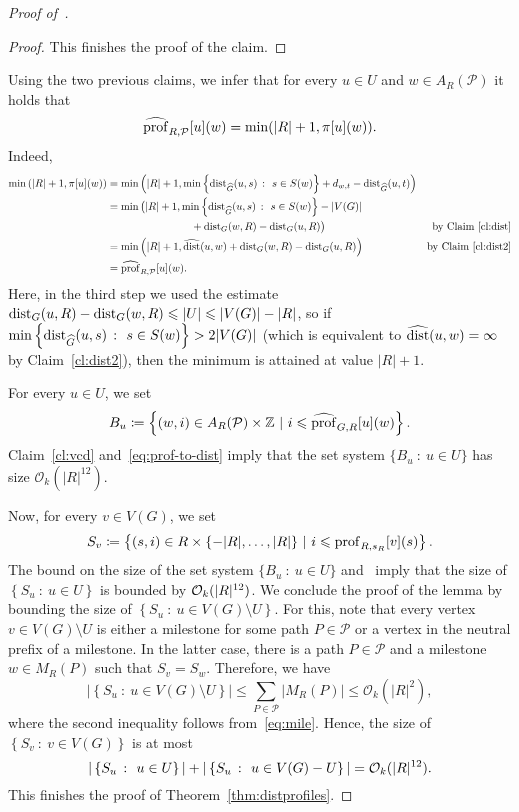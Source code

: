 \begin{proof}[Proof of~]
\begin{proof}
    This finishes the proof of the claim.
  \end{proof}
  
  Using the two previous claims, we infer that for every $u \in U$ and $w \in A_R(\mathcal{P})$ it holds that
  \begin{equation}\label{eq:prof-to-dist}
    \widehat{\mathrm{prof}}_{R,\mathcal{P}}[u](w) = \min(|R|+1, \pi[u](w)).
  \end{equation}
  Indeed, 
  \begin{align*}
  \min\left(|R|+1, \pi[u](w)\right) &= \min\left(|R|+1,\min\left\{\mathrm{dist}_{\widehat{G}}(u,s)~\colon~s\in S(w)\right\}+d_{w,t}-\mathrm{dist}_{\widehat{G}}(u,t)\right)\\
  &=\min\big(|R|+1, \min\left\{\mathrm{dist}_{\widehat{G}}(u,s)~\colon~s\in S(w)\right\} - |V(G)| &\\
  &\qquad\qquad\qquad\qquad + \mathrm{dist}_G(w,R)-\mathrm{dist}_G(u,R)\big) &\text{by Claim~\ref{cl:dist}}\\
  &=\min\left(|R|+1, \widehat{\mathrm{dist}}(u,w) + \mathrm{dist}_G(w,R)-\mathrm{dist}_G(u,R)\right)&\text{by Claim~\ref{cl:dist2}}\\
  &=\widehat{\mathrm{prof}}_{R,\mathcal{P}}[u](w).
  \end{align*}
  Here, in the third step we used the estimate $\mathrm{dist}_G(u,R) - \mathrm{dist}_G(w,R) \leqslant |U| \leqslant |V(G)|-|R|$, 
  so if $\min\left\{\mathrm{dist}_{\widehat{G}}(u,s)~\colon~s\in S(w)\right\} > 2|V(G)|$
  (which is equivalent to $\widehat{\mathrm{dist}}(u,w) = \infty$ by Claim~\ref{cl:dist2}),
  then the minimum is attained at value $|R|+1$.

  For every $u\in U$, we set
    $$B_u\coloneqq\left\{(w,i) \in A_R(\mathcal{P}) \times \mathbb{Z}~|~i \leqslant \widehat{\mathrm{prof}}_{G,R}[u](w)\right\}.$$
  Claim~\ref{cl:vcd} and~\eqref{eq:prof-to-dist} imply that the set system $\{B_u~\colon~u\in U\}$
    has size $\mathcal{O}_k(|R|^{12})$.

  
  
  Now, for every $v\in V(G)$, we set $$S_v\coloneqq\left\{(s,i) \in R \times \{-|R|,\ldots,|R|\}~|~i \leqslant \mathrm{prof}_{R,s_R}[v](s)\right\}.$$
  The bound on the size of the set system $\{B_u~\colon~u \in U\}$ and~
  imply that the size of $\left\{S_u~\colon~u \in U \right\}$ is bounded by $\mathcal{O}_k(|R|^{12})$.
  We conclude the proof of the lemma by bounding the size of $\left\{S_u~\colon~u \in V(G)\setminus U \right\}$. For this, note that every vertex $v\in V(G)\setminus U$ is either a milestone for some path $P\in\mathcal{P}$ or a vertex in the neutral prefix of a milestone.
  In the latter case, there is a path $P\in\mathcal{P}$ and a milestone $w\in M_R(P)$ such that $S_v=S_w$. Therefore, we have
  $$|\left\{S_u~\colon~u \in V(G)\setminus U \right\}|\le \sum_{P\in\mathcal{P}} |M_R(P)|\le \mathcal{O}_k(|R|^2),$$
  where the second inequality follows from~\eqref{eq:mile}.
  Hence, the size of $\left\{S_v~\colon~v \in V(G)\right\}$ is at most $$|\left\{S_u~\colon~u \in U\right\}|+|\left\{S_u~\colon~u \in V(G)- U\right\}|=\mathcal{O}_k(|R|^{12}).$$
  This finishes the proof of Theorem~\ref{thm:distprofiles}.
\end{proof}
